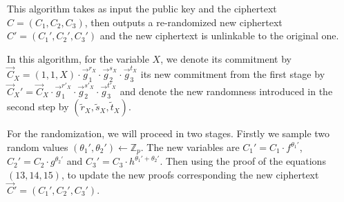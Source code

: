 This algorithm takes as input the public key and the ciphertext $C = (C_1, C_2, C_3)$, then outputs a re-randomized new ciphertext $C' = (C_1', C_2', C_3')$ and the new ciphertext is unlinkable to the original one.

In this algorithm, for the variable $X$, we denote its commitment by $\vec{C}_X = (1, 1, X) \cdot \vec{g}_1^{r_X} \cdot \vec{g}_2^{s_X} \cdot \vec{g}_3^{t_X}$ its new commitment from the first stage by $\vec{C}_X' = \vec{C}_X \cdot \vec{g}_1^{r'_X} \cdot \vec{g}_2^{s'_X} \cdot \vec{g}_3^{t'_X}$ and denote the new randomness introduced in the second step by $(\tilde{r}_X, \tilde{s}_X, \tilde{t}_X)$.

For the randomization, we will proceed in two stages. Firstly we sample two random values $(\theta_1', \theta_2') \gets \mathbb{Z}_p$. The new variables are $C_1' = C_1 \cdot f^{\theta_1'}$, $C_2' = C_2 \cdot g^{\theta_2'}$ and $C_3' = C_3 \cdot h^{\theta_1'+\theta_2'}$. Then using the proof of the equations $(13, 14, 15)$, to update the new proofs corresponding the new ciphertext $\vec{C}' = (C_1', C_2', C_3')$.

